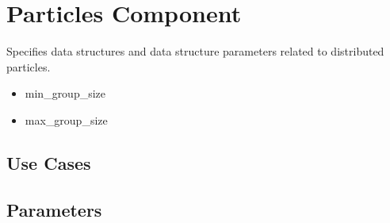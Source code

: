 \section{Particles Component} \label{s:component-particles}

Specifies data structures and data structure parameters related
to distributed particles.  

\begin{itemize}
\item min\_group\_size
\item max\_group\_size
\end{itemize}

\subsection{Use Cases}
\subsection{Parameters}
